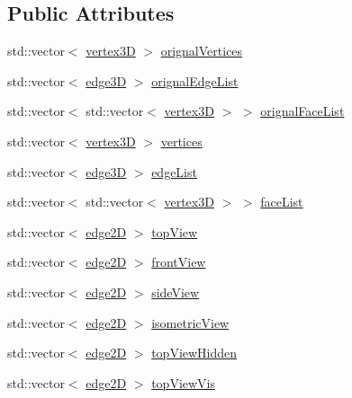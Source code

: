 \subsection*{Public Attributes}
\begin{DoxyCompactItemize}
\item 
std\+::vector$<$ \mbox{\hyperlink{structvertex3_d}{vertex3D}} $>$ \mbox{\hyperlink{class_two_d_obj_a5ed2cf65947c6c8f40de03d7ecba9f4b}{orignal\+Vertices}}
\item 
std\+::vector$<$ \mbox{\hyperlink{structedge3_d}{edge3D}} $>$ \mbox{\hyperlink{class_two_d_obj_a00ba44029623eca2c1f2b34a70f7035d}{orignal\+Edge\+List}}
\item 
std\+::vector$<$ std\+::vector$<$ \mbox{\hyperlink{structvertex3_d}{vertex3D}} $>$ $>$ \mbox{\hyperlink{class_two_d_obj_ad71fe1f675c3e1f8fe2a21c8bbc3149e}{orignal\+Face\+List}}
\item 
std\+::vector$<$ \mbox{\hyperlink{structvertex3_d}{vertex3D}} $>$ \mbox{\hyperlink{class_two_d_obj_ae1325111bfe55914cdcb399bc299442b}{vertices}}
\item 
std\+::vector$<$ \mbox{\hyperlink{structedge3_d}{edge3D}} $>$ \mbox{\hyperlink{class_two_d_obj_a48a318d3eac2dc2f2997aa4a4dc2450f}{edge\+List}}
\item 
std\+::vector$<$ std\+::vector$<$ \mbox{\hyperlink{structvertex3_d}{vertex3D}} $>$ $>$ \mbox{\hyperlink{class_two_d_obj_a57fb6cdcb9c4b706651b86785cc43381}{face\+List}}
\item 
std\+::vector$<$ \mbox{\hyperlink{structedge2_d}{edge2D}} $>$ \mbox{\hyperlink{class_two_d_obj_a041112b9394b373175014e92e7e1f9b6}{top\+View}}
\item 
std\+::vector$<$ \mbox{\hyperlink{structedge2_d}{edge2D}} $>$ \mbox{\hyperlink{class_two_d_obj_afd8b3b3be951e1a3f1461b9c2838d634}{front\+View}}
\item 
std\+::vector$<$ \mbox{\hyperlink{structedge2_d}{edge2D}} $>$ \mbox{\hyperlink{class_two_d_obj_a192176306bc5f2115e3d546f218356bb}{side\+View}}
\item 
std\+::vector$<$ \mbox{\hyperlink{structedge2_d}{edge2D}} $>$ \mbox{\hyperlink{class_two_d_obj_ace5d83e1b676e048176f7c17f5eee736}{isometric\+View}}
\item 
std\+::vector$<$ \mbox{\hyperlink{structedge2_d}{edge2D}} $>$ \mbox{\hyperlink{class_two_d_obj_a9de9704547d680c52850966a7b6397f8}{top\+View\+Hidden}}
\item 
std\+::vector$<$ \mbox{\hyperlink{structedge2_d}{edge2D}} $>$ \mbox{\hyperlink{class_two_d_obj_a2e594bbab7f3d884c05301f11c84de8e}{top\+View\+Vis}}

\end{DoxyCompactItemize}
